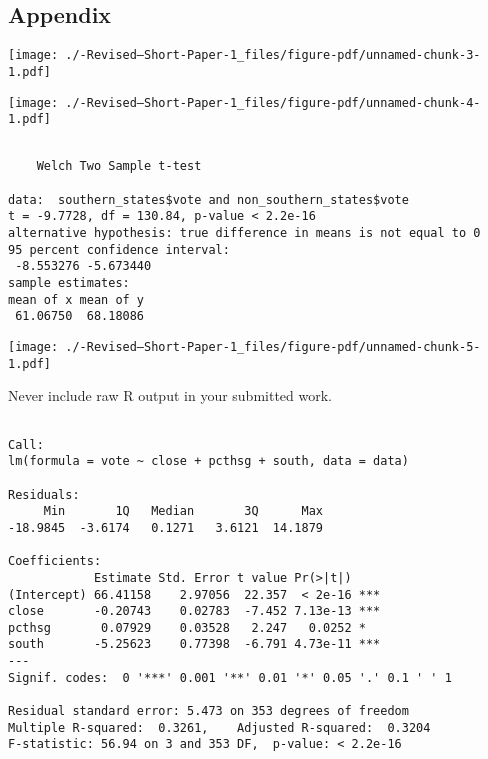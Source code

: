 \documentclass[
  letterpaper,
  DIV=11,
  numbers=noendperiod]{scrartcl}
\begin{document}
\hypertarget{appendix}{%
\subsection{Appendix}\label{appendix}}

\texttt{[image: ./-Revised--Short-Paper-1\_files/figure-pdf/unnamed-chunk-3-1.pdf]}

\texttt{[image: ./-Revised--Short-Paper-1\_files/figure-pdf/unnamed-chunk-4-1.pdf]}

\begin{verbatim}

    Welch Two Sample t-test

data:  southern_states$vote and non_southern_states$vote
t = -9.7728, df = 130.84, p-value < 2.2e-16
alternative hypothesis: true difference in means is not equal to 0
95 percent confidence interval:
 -8.553276 -5.673440
sample estimates:
mean of x mean of y 
 61.06750  68.18086 
\end{verbatim}

\texttt{[image: ./-Revised--Short-Paper-1\_files/figure-pdf/unnamed-chunk-5-1.pdf]}

\begin{tcolorbox}[enhanced jigsaw, titlerule=0mm, colframe=quarto-callout-note-color-frame, rightrule=.15mm, coltitle=black, leftrule=.75mm, breakable, colback=white, toprule=.15mm, left=2mm, bottomrule=.15mm, colbacktitle=quarto-callout-note-color!10!white, opacityback=0, arc=.35mm, bottomtitle=1mm, opacitybacktitle=0.6, title=\textcolor{quarto-callout-note-color}{\faInfo}\hspace{0.5em}{Note}, toptitle=1mm]

Never include raw R output in your submitted work.

\end{tcolorbox}

\begin{verbatim}

Call:
lm(formula = vote ~ close + pcthsg + south, data = data)

Residuals:
     Min       1Q   Median       3Q      Max 
-18.9845  -3.6174   0.1271   3.6121  14.1879 

Coefficients:
            Estimate Std. Error t value Pr(>|t|)    
(Intercept) 66.41158    2.97056  22.357  < 2e-16 ***
close       -0.20743    0.02783  -7.452 7.13e-13 ***
pcthsg       0.07929    0.03528   2.247   0.0252 *  
south       -5.25623    0.77398  -6.791 4.73e-11 ***
---
Signif. codes:  0 '***' 0.001 '**' 0.01 '*' 0.05 '.' 0.1 ' ' 1

Residual standard error: 5.473 on 353 degrees of freedom
Multiple R-squared:  0.3261,    Adjusted R-squared:  0.3204 
F-statistic: 56.94 on 3 and 353 DF,  p-value: < 2.2e-16
\end{verbatim}
\end{document}
